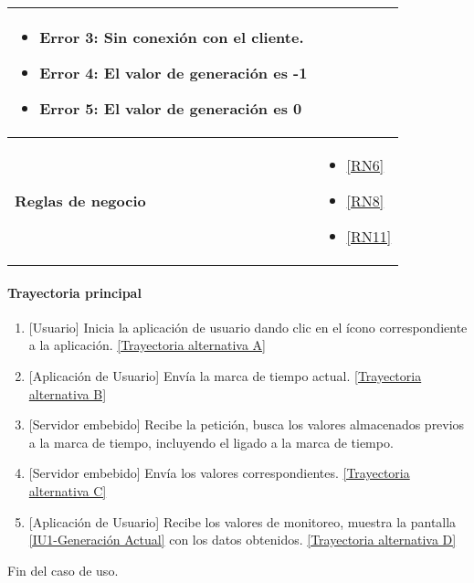 \begin{longtable}{|J{5cm}|J{10.3cm}|}
\begin{itemize}
		    \item \label{CUU1.2:Error3} Error 3: Sin conexión con el cliente.
		    \item \label{CUU1.2:Error4} Error 4: El valor de generación es -1
		    \item \label{CUU1.2:Error5} Error 5: El valor de generación es 0
		\end{itemize} \\ \hline
	\textbf{Reglas de negocio} & 
		\begin{itemize}
		    \item \ref{RN6}
			\item \ref{RN8}
			\item \ref{RN11}
		\end{itemize} \\ \hline
\end{longtable}

\paragraph{Trayectoria principal}
    \label{SUB-U-CU1.2:TP}
	\begin{enumerate}
	    \item {[Usuario]} Inicia la aplicación de usuario dando clic en el ícono correspondiente a la aplicación. \hyperref[SUB-U-CU1.2:TA]{[Trayectoria alternativa A]}
	    \item {[Aplicación de Usuario]} Envía la marca de tiempo actual. \hyperref[SUB-U-CU1.2:TB]{[Trayectoria alternativa B]} 
	    \item {[Servidor embebido]} Recibe la petición, busca los valores almacenados previos a la marca de tiempo, incluyendo el ligado a la marca de tiempo.
	    \item {[Servidor embebido]} Envía los valores correspondientes. \hyperref[SUB-U-CU1.2:TC]{[Trayectoria alternativa C]} 
	    \item {[Aplicación de Usuario]} Recibe los valores de monitoreo, muestra la pantalla \hyperref[fig:monitoreo]{[IU1-Generación Actual]} con los datos obtenidos. \hyperref[SUB-U-CU1.2:TD]{[Trayectoria alternativa D]}
	\end{enumerate}
	Fin del caso de uso.


